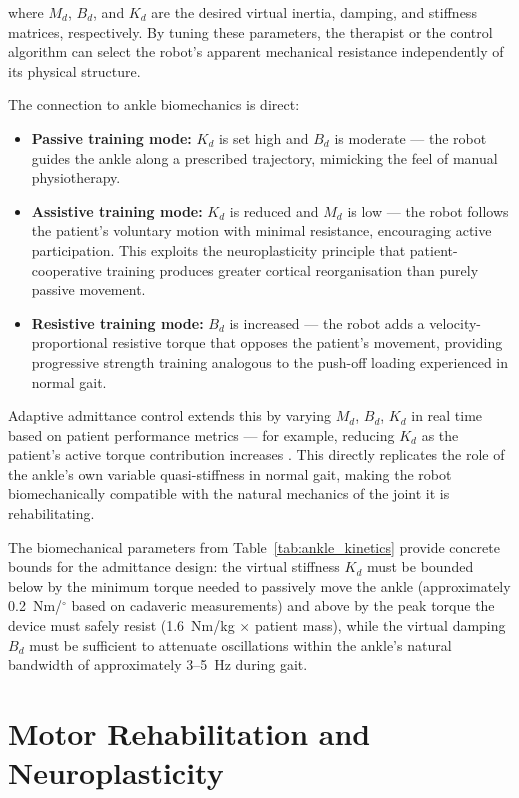 where $M_d$, $B_d$, and $K_d$ are the desired virtual inertia, damping, and stiffness matrices, respectively.
By tuning these parameters, the therapist or the control algorithm can select the robot's apparent mechanical resistance independently of its physical structure.

The connection to ankle biomechanics is direct:
\begin{itemize}
    \item \textbf{Passive training mode:} $K_d$ is set high and $B_d$ is moderate — the robot guides the ankle along a prescribed trajectory, mimicking the feel of manual physiotherapy.
    \item \textbf{Assistive training mode:} $K_d$ is reduced and $M_d$ is low — the robot follows the patient's voluntary motion with minimal resistance, encouraging active participation. This exploits the neuroplasticity principle that patient-cooperative training produces greater cortical reorganisation than purely passive movement.
    \item \textbf{Resistive training mode:} $B_d$ is increased — the robot adds a velocity-proportional resistive torque that opposes the patient's movement, providing progressive strength training analogous to the push-off loading experienced in normal gait.
\end{itemize}

Adaptive admittance control extends this by varying $M_d$, $B_d$, $K_d$ in real time based on patient performance metrics — for example, reducing $K_d$ as the patient's active torque contribution increases \cite{Zhang2018, Jamwal2016}.
This directly replicates the role of the ankle's own variable quasi-stiffness in normal gait, making the robot biomechanically compatible with the natural mechanics of the joint it is rehabilitating.

The biomechanical parameters from Table~\ref{tab:ankle_kinetics} provide concrete bounds for the admittance design: the virtual stiffness $K_d$ must be bounded below by the minimum torque needed to passively move the ankle (approximately 0.2~Nm/$^{\circ}$ based on cadaveric measurements) and above by the peak torque the device must safely resist (1.6~Nm/kg $\times$ patient mass), while the virtual damping $B_d$ must be sufficient to attenuate oscillations within the ankle's natural bandwidth of approximately 3--5~Hz during gait.

\section{Motor Rehabilitation and Neuroplasticity}

